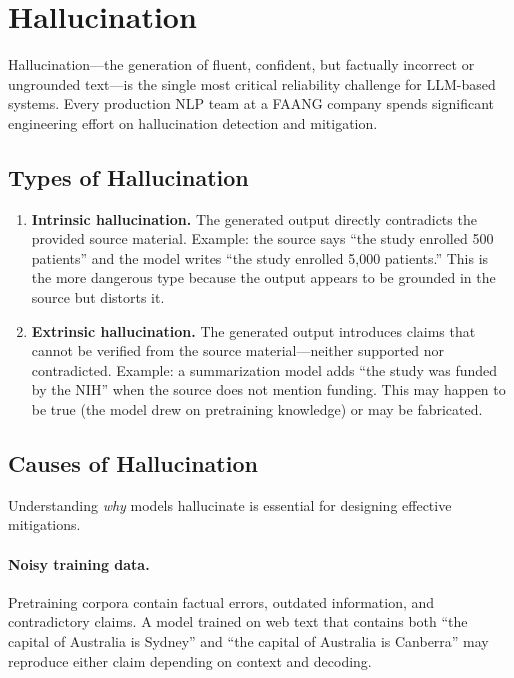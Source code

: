 \section{Hallucination}
\label{sec:hallucination}

Hallucination---the generation of fluent, confident, but factually incorrect or
ungrounded text---is the single most critical reliability challenge for
LLM-based systems.  Every production NLP team at a FAANG company spends
significant engineering effort on hallucination detection and mitigation.

\subsection{Types of Hallucination}

\begin{enumerate}[label=\textbf{\arabic*.}]
    \item \textbf{Intrinsic hallucination.}  The generated output directly
    contradicts the provided source material.  Example: the source says
    ``the study enrolled 500 patients'' and the model writes ``the study
    enrolled 5,000 patients.''  This is the more dangerous type because the
    output appears to be grounded in the source but distorts it.

    \item \textbf{Extrinsic hallucination.}  The generated output introduces
    claims that cannot be verified from the source material---neither
    supported nor contradicted.  Example: a summarization model adds ``the
    study was funded by the NIH'' when the source does not mention funding.
    This may happen to be true (the model drew on pretraining knowledge) or
    may be fabricated.
\end{enumerate}

\subsection{Causes of Hallucination}

Understanding \emph{why} models hallucinate is essential for designing
effective mitigations.

\paragraph{Noisy training data.}
Pretraining corpora contain factual errors, outdated information, and
contradictory claims.  A model trained on web text that contains both ``the
capital of Australia is Sydney'' and ``the capital of Australia is Canberra''
may reproduce either claim depending on context and decoding.

